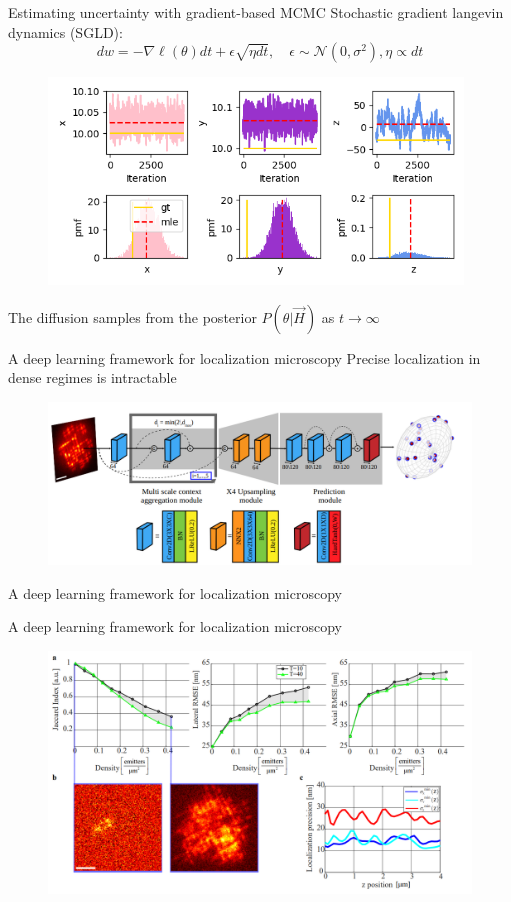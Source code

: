 \documentclass{beamer}					%
\begin{document}
\begin{frame}{Estimating uncertainty with gradient-based MCMC}
Stochastic gradient langevin dynamics (SGLD): $$dw = - \nabla \ell(\theta) dt + \epsilon \sqrt{\eta dt}, \quad \epsilon \sim \mathcal N(0, \sigma^2), \eta \propto dt$$
\begin{figure}
\includegraphics[width=11cm]{SGLD.png}
\end{figure}
The diffusion samples from the posterior $P(\theta|\vec{H})$ as $t\rightarrow\infty$

\end{frame}

\begin{frame}{A deep learning framework for localization microscopy}
Precise localization in dense regimes is intractable
\begin{figure}
\includegraphics[width=13cm]{Network.png}
\end{figure}
\end{frame}

\begin{frame}{A deep learning framework for localization microscopy}
\end{frame}

\begin{frame}{A deep learning framework for localization microscopy}
\begin{figure}
\includegraphics[width=13cm]{Jaccard.png}
\end{figure}
\end{frame}
\end{document}
